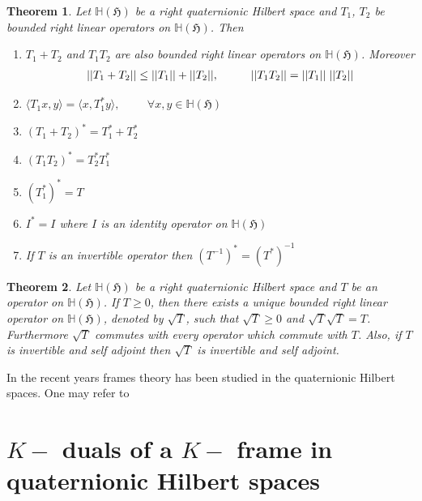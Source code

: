 \documentclass[a4paper,12pt,reqno]{amsart}
\theoremstyle{plain}
\newtheorem{theorem}{\bf Theorem}[section]
\theoremstyle{remark}
\begin{document}
	\begin{theorem}\cite{p}
		Let $\mathbb{H}(\mathfrak{H})$ be a right quaternionic Hilbert space and $T_1$, $T_2$ be bounded right linear operators on $\mathbb{H}(\mathfrak{H})$. Then 
		\begin{enumerate}
			\item [(a)] $T_1 + T_2$ and $T_1 T_2$ are also bounded right linear operators on $\mathbb{H}(\mathfrak{H})$. Moreover 
			\begin{align*}
				||T_1 + T_2|| \leq ||T_1 || + ||T_2 ||, \hspace{1cm}
				||T_1 T_2 || = ||T_1|| \hspace{0.1cm} ||T_2||
			\end{align*}
			\item [(b)] $\langle T_1x, y \rangle= \langle x, T_1^*y \rangle , \hspace{1cm} \forall x,y \in \mathbb{H}(\mathfrak{H})$
			\item [(c)] $(T_1 + T_2)^* = T_1^* + T_2^*$
			\item [(d)] $(T_1 T_2)^* = T_2^* T_1^*$
			\item [(e)] $(T_1^*)^* = T$
			\item [(f)] $I^* = I$ where $I$ is an identity operator on $\mathbb{H}(\mathfrak{H})$
			\item [(g)] If $T$ is an invertible operator then $(T^{-1})^* = (T^*)^{-1}$
		\end{enumerate}
	\end{theorem}
	
	\begin{theorem}\cite{o}
		Let $\mathbb{H}(\mathfrak{H})$ be a right quaternionic Hilbert space and $T$ be an operator on $\mathbb{H}(\mathfrak{H})$. If $T \geq 0$, then there exists a unique bounded right linear operator on $\mathbb{H}(\mathfrak{H})$, denoted by $\sqrt{T}$, such that $\sqrt{T} \geq 0$ and $\sqrt{T} \sqrt{T} = T$. Furthermore $\sqrt{T}$ commutes with every operator which commute with $T$. Also, if $T$ is invertible and self adjoint then $\sqrt{T}$ is invertible and self adjoint.
	\end{theorem}
	
	In the recent years frames theory has been studied in the quaternionic Hilbert spaces. One may refer to \cite{a, j, o,p,r,s,t,u,v}
	\section{$K-$ duals of a $K-$ frame in quaternionic Hilbert spaces}
	
\end{document}
